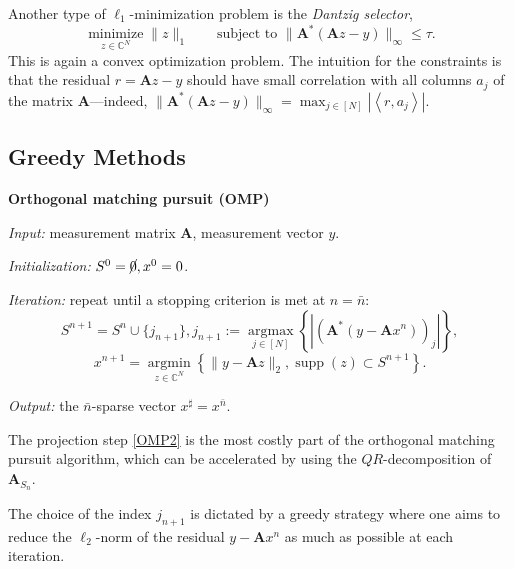Another type of $\ell_1$-minimization problem is the \emph{\textcolor[rgb]{1,0,0}{Dantzig selector}},
\begin{equation}
    \mathop{\mathrm{minimize}}\limits_{z \in \mathbb{C}^N} \|z\|_1 \qquad \text{subject to } \|\mathbf{A}^*(\mathbf{A}z - y)\|_{\infty} \leq \tau.
    \label{eq0.3.4}
\end{equation}
This is again a convex optimization problem. The intuition for the constraints is that the residual $r = \mathbf{A}z -y $ should have small correlation with all columns $a_j$ of the matrix $\mathbf{A}$---indeed, $\|\mathbf{A}^*(\mathbf{A}z -y)\|_{\infty} = \max_{j \in [N]} \left|\left<r, a_j\right>\right|$.  

\subsection{Greedy Methods}

\begin{mdframed}
    \label{OMP}
    \begin{center}
        \textbf{Orthogonal matching pursuit (OMP)}
    \end{center}
    \emph{Input:} measurement matrix $\mathbf{A}$, measurement vector $y$.

    \emph{Initialization: } $S^0 = \cancel{0}, x^0 = 0$. 
    
    \emph{Iteration:} repeat until a stopping criterion is met at $n = \bar{n}$:
    \begin{equation}
        S^{n+1} = S^n \cup \{j_{n+1}\}, j_{n+1} := \mathop{\mathrm{argmax}}\limits_{j \in [N]} \left\{ \left|(\mathbf{A}^*(y-\mathbf{A}x^n))_j\right| \right\}, \tag{$OMP_1$}
        \label{eqOMP1}
    \end{equation}
    \begin{equation}
        x^{n+1} = \mathop{\mathrm{argmin}}\limits_{z \in \mathbb{C}^N} \left\{ \|y - \mathbf{A}z\|_2,\mathop{\mathrm{supp}}(z) \subset S^{n+1} \right\}. \tag{$OMP_2$}
        \label{OMP2}
    \end{equation}

    \emph{Output:} the $\bar{n}$-sparse vector $x^{\sharp} = x^{\bar{n}}$.
\end{mdframed}

The projection step \cref{OMP2} is the most costly part of the orthogonal matching pursuit algorithm, which can be accelerated by using the $QR$-decomposition of $\mathbf{A}_{S_n}$. 

The choice of the index $j_{n+1}$ is dictated by a greedy strategy where one aims to reduce the $\ell_2$-norm of the residual $y - \mathbf{A}x^n$ as much as possible at each iteration. 

